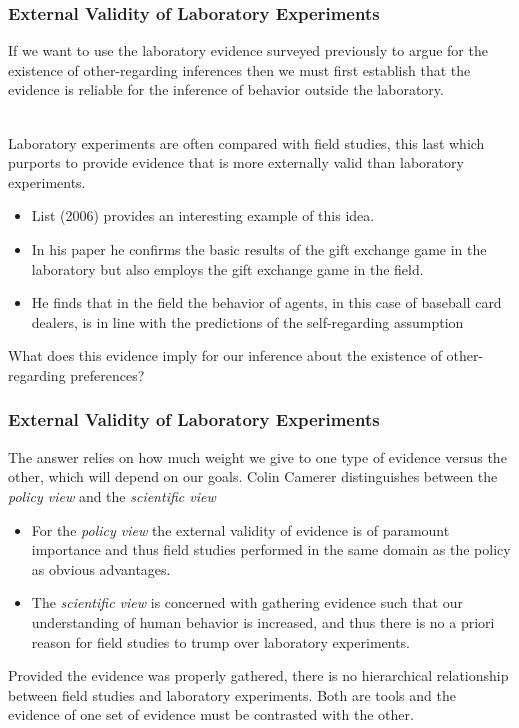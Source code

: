 \documentclass{beamer}
\begin{document}
\begin{frame}
\frametitle{External Validity of Laboratory Experiments}

If we want to use the laboratory evidence surveyed previously to argue for the existence of other-regarding inferences then we must first establish that the evidence is reliable for the inference of behavior outside the laboratory. \\~\

Laboratory experiments are often compared with field studies, this last which purports to provide evidence that is more externally valid than laboratory experiments.

\begin{itemize}
\item List (2006) provides an interesting example of this idea. 
\item In his paper he confirms the basic results of the gift exchange game in the laboratory but also employs the gift exchange game in the field.
\item He finds that in the field the behavior of agents, in this case of baseball card dealers, is in line with the predictions of the self-regarding assumption
\end{itemize}

What does this evidence imply for our inference about the existence of other-regarding preferences?

\end{frame}

\begin{frame}
\frametitle{External Validity of Laboratory Experiments}

The answer relies on how much weight we give to one type of evidence versus the other, which will depend on our goals. Colin Camerer distinguishes between the \textit{policy view} and the \textit{scientific view}

\begin{itemize}
\item For the \textit{policy view} the external validity of evidence is of paramount importance and thus field studies performed in the same domain as the policy as obvious advantages.
\item The \textit{scientific view} is concerned with gathering evidence such that our understanding of human behavior is increased, and thus there is no a priori reason for field studies to trump over laboratory experiments.
\end{itemize}

Provided the evidence was properly gathered, there is no hierarchical relationship between field studies and laboratory experiments. Both are tools and the evidence of one set of evidence must be contrasted with the other.

\end{frame}
\end{document}
